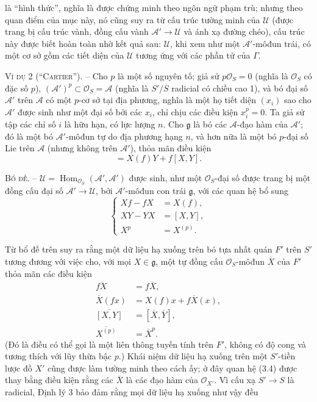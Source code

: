 là ``hình thức'', nghĩa là được chứng minh theo ngôn ngữ phạm trù; nhưng theo
quan điểm của mục này, nó cũng suy ra từ cấu trúc tường minh của $\mathcal U$
(được trang bị cấu trúc vành, đồng cấu vành
$\mathcal A'\longrightarrow\mathcal U$ và ánh xạ đường chéo), cấu trúc này được
biết hoàn toàn nhờ kết quả sau: $\mathcal U$, khi xem như một
$\mathcal A'$-môđun trái, có một cơ sở gồm các tiết diện của $\mathcal U$
tương ứng với các phần tử của $\Gamma$.

\textsc{Ví dụ 2 (``Cartier'').} -- Cho $p$ là một số nguyên tố; giả sử
$p\mathcal O_S=0$ (nghĩa là $\mathcal O_S$ có đặc số $p$),
$(\mathcal A')^p\subset\mathcal O_S=\mathcal A$ (nghĩa là $S'/S$ radicial có
chiều cao 1), và bó đại số $\mathcal A'$ trên $\mathcal A$ có một $p$-cơ sở
tại địa phương, nghĩa là một họ tiết diện $(x_i)$ sao cho $\mathcal A'$ được sinh
như một đại số bởi các $x_i$, chỉ chịu các điều kiện $x_i^p=0$. Ta giả sử tập
các chỉ số $i$ là hữu hạn, có lực lượng $n$. Cho $\mathfrak g$ là bó các
$\mathcal A$-đạo hàm của $\mathcal A'$; đó là một bó $\mathcal A'$-môđun tự do
địa phương hạng $n$, và hơn nữa là một bó $p$-đại số Lie trên $\mathcal A$
(nhưng không trên $\mathcal A'$), thỏa mãn điều kiện
\begin{equation}
  [X,fY]=X(f)Y+f[X,Y].
  \tag{3.5}
\end{equation}

\textsc{Bổ đề.} -- $\mathcal U=
\operatorname{Hom}_{\mathcal O_S}(\mathcal A',\mathcal A')$ được sinh, như một
$\mathcal O_S$-đại số được trang bị một đồng cấu đại số
$\mathcal A'\longrightarrow\mathcal U$, bởi $\mathcal A'$-môđun con trái
$\mathfrak g$, với các quan hệ bổ sung
\begin{equation}
  \left\{
  \begin{aligned}
    Xf-fX&=X(f),\\
    XY-YX&=[X,Y],\\
    X^p&=X^{(p)}.
  \end{aligned}
  \right.
  \tag{3.6}
\end{equation}

Từ bổ đề trên suy ra rằng một dữ liệu hạ xuống trên bó tựa nhất quán $F'$ trên
$S'$ tương đương với việc cho, với mọi $X\in\mathfrak g$, một tự đồng cấu
$\mathcal O_S$-môđun $\overline X$ của $F'$ thỏa mãn các điều kiện
\begin{align}
  \overline{fX}&=f\overline X, \tag{3.7}\\
  \overline X(fx)&=X(f)x+f\overline X(x), \tag{3.8}\\
  \overline{[X,Y]}&=[\overline X,\overline Y], \tag{3.9}\\
  \overline{X^{(p)}}&=\overline X^p. \tag{3.10}
\end{align}
(Đó là điều có thể gọi là một liên thông tuyến tính trên $F'$, không có độ
cong và tương thích với lũy thừa bậc $p$.) Khái niệm dữ liệu hạ xuống trên một
$S'$-tiền lược đồ $X'$ cũng được làm tường minh theo cách ấy; ở đây quan hệ
(3.4) được thay bằng điều kiện rằng các $\overline X$ là các đạo hàm của
$\mathcal O_{X'}$. Vì cấu xạ $S'\longrightarrow S$ là radicial, Định lý 3 bảo
đảm rằng mọi dữ liệu hạ xuống như vậy đều

